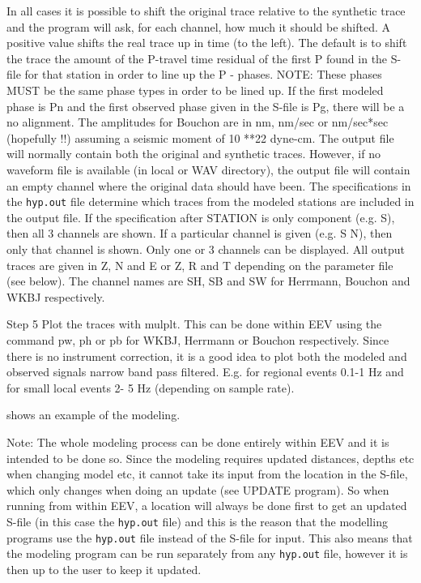 In all cases it is possible to shift the original trace relative to the synthetic trace and the program will ask, for each channel, how much it should be shifted. A positive value shifts the real trace up in time (to the left). The default is to shift the trace the amount of the P-travel time residual of the first P found in the S-file for that station in order to line up the P - phases. NOTE: These phases MUST be the same phase types in order to be lined up. If the first modeled phase is Pn and the first observed phase given in the S-file is Pg, there will be a no alignment. The amplitudes for Bouchon are in nm, nm/sec or nm/sec*sec (hopefully !!) assuming a seismic moment of 10 **22 dyne-cm. The output file will normally contain both the original and synthetic traces. However, if no waveform file is available (in local or WAV directory), the output file will contain an empty channel where the original data should have been. The specifications in the \texttt{hyp.out} file determine which traces from the modeled stations are included in the output file. If the specification after STATION is only component (e.g. S), then all 3 channels are shown. If a particular channel is given (e.g. S  N), then only that channel is shown. Only one or 3 channels can be displayed. 
\newline
All output traces are given in Z, N and E or  Z, R and T depending on the parameter file (see below). The channel names are SH, SB and SW for Herrmann, Bouchon and WKBJ respectively. 

Step 5 \newline
Plot the traces with mulplt. This can be done within EEV using the command pw, ph or pb for WKBJ, Herrmann or Bouchon respectively. Since there is no instrument correction, it is a good idea to plot both the modeled and observed signals narrow band pass filtered. E.g. for regional events 0.1-1 Hz and for small local events 2- 5 Hz (depending on sample rate). 

shows an example of the modeling. 

Note: The whole modeling process can be done entirely within EEV and it is intended to be done so. Since the modeling requires updated distances, depths etc when changing model etc, it cannot take its input from the location in the S-file, which only changes when doing an update (see UPDATE program). So when running from within EEV, a location will always be done first to get an updated S-file (in this case the \texttt{hyp.out} file) and this is the reason that the modelling programs use the \texttt{hyp.out} file instead of the S-file for input. This also means that the modeling program can be run separately from any \texttt{hyp.out} file, however it is then up to the user to keep it updated. 

